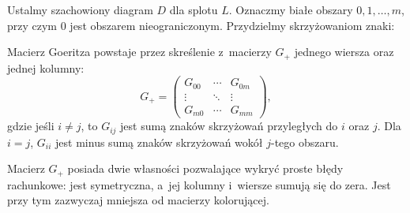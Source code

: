 Ustalmy szachowiony diagram $D$ dla splotu $L$.
Oznaczmy białe obszary $0, 1, \ldots, m$, przy czym $0$ jest obszarem nieograniczonym.
Przydzielmy skrzyżowaniom znaki:
\begin{comment}
    \[\begin{tikzpicture}[baseline=-0.65ex, scale=0.12]
    \useasboundingbox (-5, -5) rectangle (5,5);
    \begin{knot}[clip width=5, end tolerance=1pt, flip crossing/.list={1}]
        \strand[semithick] (-5,5) to (5,-5);
        \strand[semithick] (-5,-5) to (5,5);
        \fill[blue!20!white] (-4, 5) to (0, 1) to (4, 5);
        \fill[blue!20!white] (-4, -5) to (0, -1) to (4, -5);
        \node[darkblue] at (-5, 0) {$+1$};
    \end{knot}
    \end{tikzpicture}
    \quad\quad\quad
    \quad\quad\quad
    \begin{tikzpicture}[baseline=-0.65ex, scale=0.12]
    \useasboundingbox (-5, -5) rectangle (5,5);
    \begin{knot}[clip width=5, end tolerance=1pt]
        \strand[semithick] (-5,5) to (5,-5);
        \strand[semithick] (-5,-5) to (5,5);
        \fill[blue!20!white] (-4, 5) to (0, 1) to (4, 5);
        \fill[blue!20!white] (-4, -5) to (0, -1) to (4, -5);
        \node[darkblue] at (-5, 0) {$-1$};
    \end{knot}
    \end{tikzpicture}\]
\end{comment}

\begin{definition}
    Macierz Goeritza powstaje przez skreślenie z~macierzy $G_+$ jednego wiersza oraz jednej kolumny:
    \[
        G_+=\begin{pmatrix}
        G_{00} & \cdots & G_{0m} \\
        \vdots & \ddots & \vdots \\
        G_{m0} & \cdots & G_{mm}
        \end{pmatrix},
    \]
    gdzie jeśli $i\neq j$, to $G_{ij}$ jest sumą znaków skrzyżowań przyległych do $i$ oraz $j$.
    Dla $i = j$, $G_{ii}$ jest minus sumą znaków skrzyżowań wokół $j$-tego obszaru.
\end{definition}

Macierz $G_+$ posiada dwie własności pozwalające wykryć proste błędy rachunkowe: jest symetryczna, a~jej kolumny i~wiersze sumują się do zera.
Jest przy tym zazwyczaj mniejsza od macierzy kolorującej.

